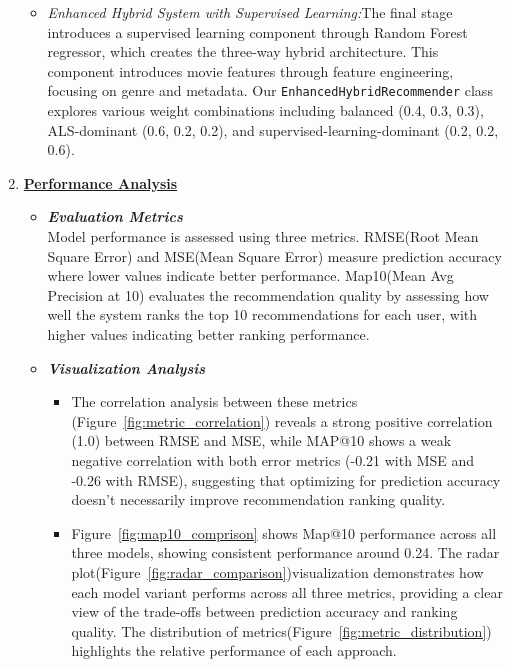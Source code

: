 \documentclass[9pt]{article}
\begin{document}
\begin{enumerate}
\begin{itemize}
      \item \textit{Enhanced Hybrid System with Supervised Learning:}The final stage introduces a supervised learning component through Random Forest regressor, which creates the three-way hybrid architecture. This component introduces movie features through feature engineering, focusing on genre and metadata. Our \texttt{EnhancedHybridRecommender} class explores various weight combinations including balanced (0.4, 0.3, 0.3), ALS-dominant (0.6, 0.2, 0.2), and supervised-learning-dominant (0.2, 0.2, 0.6).
    \end{itemize}
    \item \textbf{\underline{Performance Analysis}}
    \begin{itemize}
      \item \textit{\textbf{Evaluation Metrics}}\\Model performance is assessed using three metrics. RMSE(Root Mean Square Error) and MSE(Mean Square Error) measure prediction accuracy where lower values indicate better performance. Map\@10(Mean Avg Precision at 10) evaluates the recommendation quality by assessing how well the system ranks the top 10 recommendations for each user, with higher values indicating better ranking performance.
      \item \textit{\textbf{Visualization Analysis}}
      \begin{itemize}
        \item The correlation analysis between these metrics (Figure~\ref{fig:metric_correlation}) reveals a strong positive correlation (1.0) between RMSE and MSE, while MAP@10 shows a weak negative correlation with both error metrics (-0.21 with MSE and -0.26 with RMSE), suggesting that optimizing for prediction accuracy doesn't necessarily improve recommendation ranking quality.
        \item Figure~\ref{fig:map10_comprison} shows Map@10 performance across all three models, showing consistent performance around 0.24. The radar plot(Figure~\ref{fig:radar_comparison})visualization demonstrates how each model variant performs across all three metrics, providing a clear view of the trade-offs between prediction accuracy and ranking quality. The distribution of metrics(Figure~\ref{fig:metric_distribution}) highlights the relative performance of each approach.
      \end{itemize}
      \begin{figure}[H]
\end{figure}
\end{itemize}
\end{enumerate}
\end{document}
